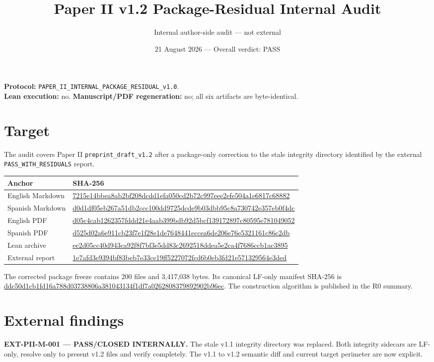 \documentclass[11pt]{article}
\title{Paper II v1.2 Package-Residual Internal Audit}
\author{Internal author-side audit --- not external}
\date{21 August 2026 --- Overall verdict: PASS}
\begin{document}
\maketitle
\textbf{Protocol:} \texttt{PAPER\_II\_INTERNAL\_PACKAGE\_RESIDUAL\_v1.0}.\\
\textbf{Lean execution:} no.\quad
\textbf{Manuscript/PDF regeneration:} no; all six artifacts are byte-identical.

\section{Target}
The audit covers Paper II \texttt{preprint\_draft\_v1.2} after a package-only
correction to the stale integrity directory identified by the external
\texttt{PASS\_WITH\_RESIDUALS} report.

\small
\begin{longtable}{p{.25\linewidth}p{.67\linewidth}}
\toprule Anchor & SHA-256 \\ \midrule
English Markdown & \url{7215e14bbea8ab2bf208dcdd1efa050cd2b72c997eee2efe504a1e6817c68882} \\
Spanish Markdown & \url{d0d1df05eb267a51db2ccc100dd9725dcde9b03dbb95c8a730742e357eb0f4dc} \\
English PDF & \url{d05c4cab1262357fddd21e4aab399bdb92d5bcf139172897c80595e781049052} \\
Spanish PDF & \url{d525d02a6e911cb23f7e1f28e1de7648441eccea6de206e76e5321161c86c2db} \\
Lean archive & \url{ee2d05cc40d943ca92f8f7bf3e5dd83c2692518ddea5e2ca4f7686ccb1ac3895} \\
External report & \url{1e7afd3e9394bf83beb7e33ce19ff5227072fcd6b0eb3fd21e571329564e3ded} \\
\bottomrule
\end{longtable}
\normalsize

The corrected package freeze contains 200 files and 3,417,038 bytes. Its
canonical LF-only manifest SHA-256 is
\url{ddc50d1cb1fd16a788d03738806a381043134f1df7a0262808379892902b96ec}.
The construction algorithm is published in the R0 summary.

\section{External findings}
\textbf{EXT-PII-M-001 --- PASS/CLOSED INTERNALLY.} The stale v1.1 integrity
directory was replaced. Both integrity sidecars are LF-only, resolve only to
present v1.2 files and verify completely. The v1.1 to v1.2 semantic diff and
current target perimeter are now explicit.
\end{document}
